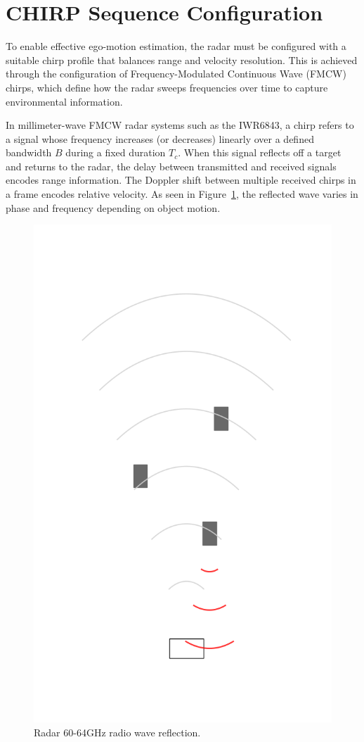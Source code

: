 \section{CHIRP Sequence Configuration}

\label{sec:chirp-theory}

To enable effective ego-motion estimation, the radar must be configured with a suitable chirp profile that balances range and velocity resolution.
This is achieved through the configuration of Frequency-Modulated Continuous Wave (FMCW) chirps, which define how the radar sweeps frequencies over time to capture environmental information.

In millimeter-wave FMCW radar systems such as the IWR6843, a chirp refers to a signal whose frequency increases (or decreases) linearly over a defined bandwidth $B$ during a fixed duration $T_c$.
When this signal reflects off a target and returns to the radar, the delay between transmitted and received signals encodes range information.
The Doppler shift between multiple received chirps in a frame encodes relative velocity.  
As seen in Figure~\ref{fig:radarWavePropagation}, the reflected wave varies in phase and frequency depending on object motion.


\begin{figure}[!htbp]
    \centering
    \includegraphics[width=0.5\linewidth]{images/radarWave.png}
    \caption{Radar 60-64GHz radio wave reflection.}
    \label{fig:radarWavePropagation}
\end{figure}

